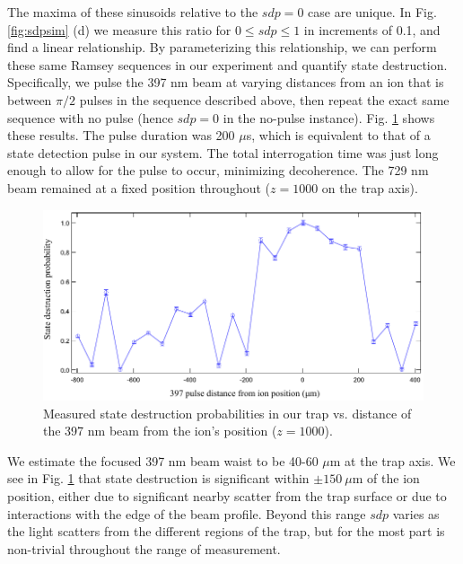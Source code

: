 The maxima of these sinusoids relative to the $sdp = 0$ case are unique. In Fig. \ref{fig:sdpsim} (d) we measure this ratio for $0 \leq sdp \leq 1$ in increments of 0.1, and find a linear relationship. By parameterizing this relationship, we can perform these same Ramsey sequences in our experiment and quantify state destruction. Specifically, we pulse the 397 nm beam at varying distances from an ion that is between $\pi / 2$ pulses in the sequence described above, then repeat the exact same sequence with no pulse (hence $sdp = 0$ in the no-pulse instance). Fig. \ref{fig:sdp} shows these results. The pulse duration was 200 $\mu$s, which is equivalent to that of a state detection pulse in our system. The total interrogation time was just long enough to allow for the pulse to occur, minimizing decoherence. The 729 nm beam remained at a fixed position throughout ($z = 1000$ on the trap axis). 

\begin{figure}[t]
    \begin{center}
        \includegraphics{figures/5/Fig_sdp}
        \caption{\label{fig:sdp} Measured state destruction probabilities in our trap vs. distance of the 397 nm beam from the ion's position ($z = 1000$). }
    \end{center}
\end{figure}


We estimate the focused 397 nm beam waist to be 40-60 $\mu$m at the trap axis. We see in Fig. \ref{fig:sdp} that state destruction is significant within $\pm 150 \ \mu$m of the ion position, either due to significant nearby scatter from the trap surface or due to interactions with the edge of the beam profile. Beyond this range $sdp$ varies as the light scatters from the different regions of the trap, but for the most part is non-trivial throughout the range of measurement. 







